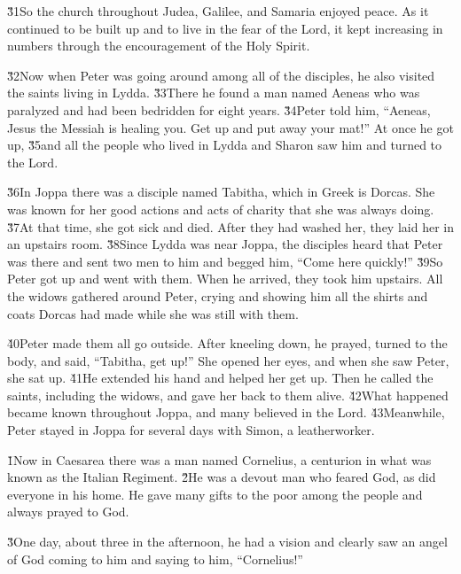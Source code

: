 \v{31}So the church throughout Judea, Galilee, and Samaria enjoyed peace. As it continued to be built up and to live in the fear of the Lord, it kept increasing in numbers through the encouragement of the Holy Spirit.

\v{32}Now when Peter was going around among all of the disciples, he also visited the saints living in Lydda. \v{33}There he found a man named Aeneas who was paralyzed and had been bedridden for eight years. \v{34}Peter told him, ``Aeneas, Jesus the Messiah is healing you. Get up and put away your mat!'' At once he got up, \v{35}and all the people who lived in Lydda and Sharon saw him and turned to the Lord.

\v{36}In Joppa there was a disciple named Tabitha, which in Greek is Dorcas. She was known for her good actions and acts of charity that she was always doing. \v{37}At that time, she got sick and died. After they had washed her, they laid her in an upstairs room. \v{38}Since Lydda was near Joppa, the disciples heard that Peter was there and sent two men to him and begged him, ``Come here quickly!'' \v{39}So Peter got up and went with them. When he arrived, they took him upstairs. All the widows gathered around Peter, crying and showing him all the shirts and coats Dorcas had made while she was still with them.

\v{40}Peter made them all go outside. After kneeling down, he prayed, turned to the body, and said, ``Tabitha, get up!'' She opened her eyes, and when she saw Peter, she sat up. \v{41}He extended his hand and helped her get up. Then he called the saints, including the widows, and gave her back to them alive. \v{42}What happened became known throughout Joppa, and many believed in the Lord. \v{43}Meanwhile, Peter stayed in Joppa for several days with Simon, a leatherworker.

\v{1}Now in Caesarea there was a man named Cornelius, a centurion in what was known as the Italian Regiment. \v{2}He was a devout man who feared God, as did everyone in his home. He gave many gifts to the poor among the people and always prayed to God.

\v{3}One day, about three in the afternoon, he had a vision and clearly saw an angel of God coming to him and saying to him, ``Cornelius!''

